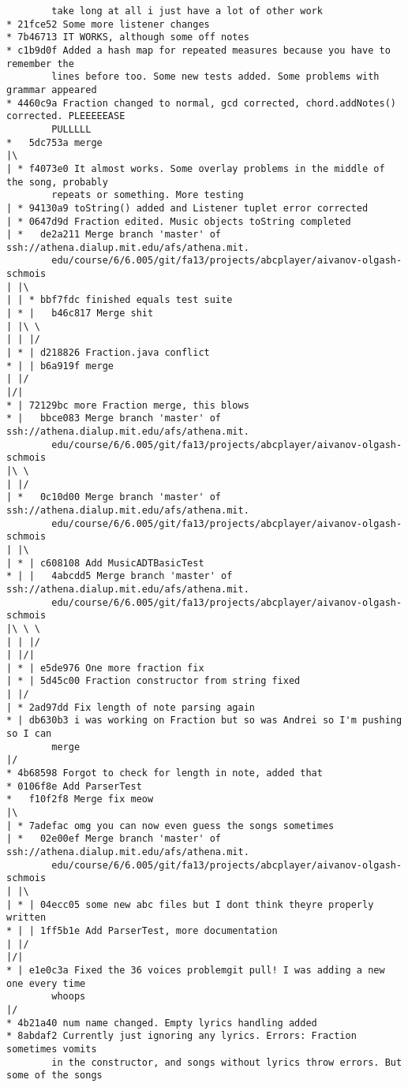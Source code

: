 \documentclass[12pt]{book}
\begin{document}
\begin{Verbatim}
        take long at all i just have a lot of other work
* 21fce52 Some more listener changes
* 7b46713 IT WORKS, although some off notes
* c1b9d0f Added a hash map for repeated measures because you have to remember the 
        lines before too. Some new tests added. Some problems with grammar appeared
* 4460c9a Fraction changed to normal, gcd corrected, chord.addNotes() corrected. PLEEEEEASE 
        PULLLLL
*   5dc753a merge
|\
| * f4073e0 It almost works. Some overlay problems in the middle of the song, probably 
        repeats or something. More testing
| * 94130a9 toString() added and Listener tuplet error corrected
| * 0647d9d Fraction edited. Music objects toString completed
| *   de2a211 Merge branch 'master' of ssh://athena.dialup.mit.edu/afs/athena.mit.
        edu/course/6/6.005/git/fa13/projects/abcplayer/aivanov-olgash-schmois
| |\
| | * bbf7fdc finished equals test suite
| * |   b46c817 Merge shit
| |\ \
| | |/
| * | d218826 Fraction.java conflict
* | | b6a919f merge
| |/
|/|
* | 72129bc more Fraction merge, this blows
* |   bbce083 Merge branch 'master' of ssh://athena.dialup.mit.edu/afs/athena.mit.
        edu/course/6/6.005/git/fa13/projects/abcplayer/aivanov-olgash-schmois
|\ \
| |/
| *   0c10d00 Merge branch 'master' of ssh://athena.dialup.mit.edu/afs/athena.mit.
        edu/course/6/6.005/git/fa13/projects/abcplayer/aivanov-olgash-schmois
| |\
| * | c608108 Add MusicADTBasicTest
* | |   4abcdd5 Merge branch 'master' of ssh://athena.dialup.mit.edu/afs/athena.mit.
        edu/course/6/6.005/git/fa13/projects/abcplayer/aivanov-olgash-schmois
|\ \ \
| | |/
| |/|
| * | e5de976 One more fraction fix
| * | 5d45c00 Fraction constructor from string fixed
| |/
| * 2ad97dd Fix length of note parsing again
* | db630b3 i was working on Fraction but so was Andrei so I'm pushing so I can 
        merge
|/
* 4b68598 Forgot to check for length in note, added that
* 0106f8e Add ParserTest
*   f10f2f8 Merge fix meow
|\
| * 7adefac omg you can now even guess the songs sometimes
| *   02e00ef Merge branch 'master' of ssh://athena.dialup.mit.edu/afs/athena.mit.
        edu/course/6/6.005/git/fa13/projects/abcplayer/aivanov-olgash-schmois
| |\
| * | 04ecc05 some new abc files but I dont think theyre properly written
* | | 1ff5b1e Add ParserTest, more documentation
| |/
|/|
* | e1e0c3a Fixed the 36 voices problemgit pull! I was adding a new one every time 
        whoops
|/
* 4b21a40 num name changed. Empty lyrics handling added
* 8abdaf2 Currently just ignoring any lyrics. Errors: Fraction sometimes vomits 
        in the constructor, and songs without lyrics throw errors. But some of the songs 

\end{Verbatim}
\end{document}
